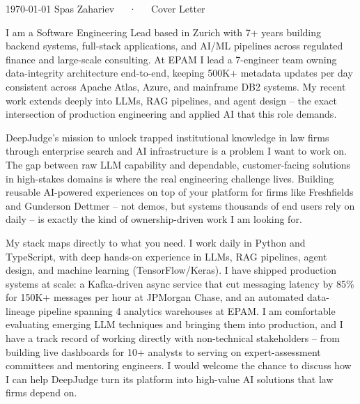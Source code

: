 \documentclass[11pt, a4paper]{awesome-cv}
\begin{document}
\makecvheader[R]

\makecvfooter
  {\today}
  {Spas Zahariev~~~·~~~Cover Letter}
  {}

\makelettertitle

\begin{cvletter}

I am a Software Engineering Lead based in Zurich with 7+ years building backend systems, full-stack applications, and AI/ML pipelines across regulated finance and large-scale consulting. At EPAM I lead a 7-engineer team owning data-integrity architecture end-to-end, keeping 500K+ metadata updates per day consistent across Apache Atlas, Azure, and mainframe DB2 systems. My recent work extends deeply into LLMs, RAG pipelines, and agent design -- the exact intersection of production engineering and applied AI that this role demands.

DeepJudge's mission to unlock trapped institutional knowledge in law firms through enterprise search and AI infrastructure is a problem I want to work on. The gap between raw LLM capability and dependable, customer-facing solutions in high-stakes domains is where the real engineering challenge lives. Building reusable AI-powered experiences on top of your platform for firms like Freshfields and Gunderson Dettmer -- not demos, but systems thousands of end users rely on daily -- is exactly the kind of ownership-driven work I am looking for.

My stack maps directly to what you need. I work daily in Python and TypeScript, with deep hands-on experience in LLMs, RAG pipelines, agent design, and machine learning (TensorFlow/Keras). I have shipped production systems at scale: a Kafka-driven async service that cut messaging latency by 85\% for 150K+ messages per hour at JPMorgan Chase, and an automated data-lineage pipeline spanning 4 analytics warehouses at EPAM. I am comfortable evaluating emerging LLM techniques and bringing them into production, and I have a track record of working directly with non-technical stakeholders -- from building live dashboards for 10+ analysts to serving on expert-assessment committees and mentoring engineers. I would welcome the chance to discuss how I can help DeepJudge turn its platform into high-value AI solutions that law firms depend on.

\end{cvletter}


\makeletterclosing
\end{document}
